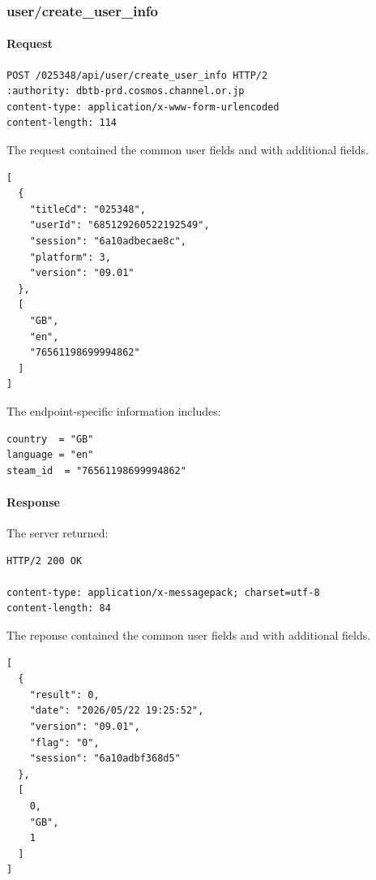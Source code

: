 \subsubsection{user/create\_user\_info}
\label{subsec:api_user_create_user_info}

\paragraph{Request}

\begin{lstlisting}
POST /025348/api/user/create_user_info HTTP/2
:authority: dbtb-prd.cosmos.channel.or.jp
content-type: application/x-www-form-urlencoded
content-length: 114
\end{lstlisting}

The request contained the common user fields and with additional fields.

\begin{lstlisting}
[
  {
    "titleCd": "025348",
    "userId": "685129260522192549",
    "session": "6a10adbecae8c",
    "platform": 3,
    "version": "09.01"
  },
  [
    "GB",
    "en",
    "76561198699994862"
  ]
]
\end{lstlisting}

The endpoint-specific information includes:

\begin{lstlisting}
country  = "GB"
language = "en"
steam_id  = "76561198699994862"
\end{lstlisting}

\newpage

\paragraph{Response}

The server returned:

\begin{lstlisting}
HTTP/2 200 OK

content-type: application/x-messagepack; charset=utf-8
content-length: 84
\end{lstlisting}

The reponse contained the common user fields and with additional fields.

\begin{lstlisting}
[
  {
    "result": 0,
    "date": "2026/05/22 19:25:52",
    "version": "09.01",
    "flag": "0",
    "session": "6a10adbf368d5"
  },
  [
    0,
    "GB",
    1
  ]
]
\end{lstlisting}

